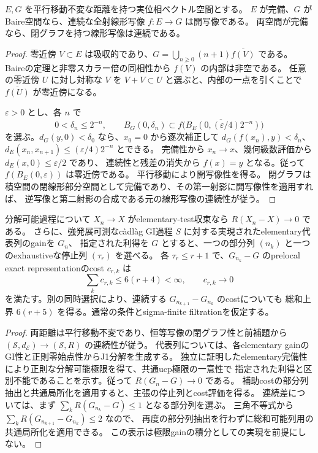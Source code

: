 \begin{lemma}[平行移動不変な完備距離を持つ実TVSの開写像と閉グラフ]
$E,G$ を平行移動不変な距離を持つ実位相ベクトル空間とする。
$E$ が完備、$G$ がBaire空間なら、連続な全射線形写像 $f:E\to G$ は開写像である。
両空間が完備なら、閉グラフを持つ線形写像は連続である。
\end{lemma}
\begin{proof}
零近傍 $V\subset E$ は吸収的であり、$G=\bigcup_{n\ge0}(n+1)\overline{f(V)}$ である。
Baireの定理と非零スカラー倍の同相性から $\overline{f(V)}$ の内部は非空である。
任意の零近傍 $U$ に対し対称な $V$ を $V+V\subset U$ と選ぶと、内部の一点を引くことで
$\overline{f(U)}$ が零近傍になる。

$\varepsilon>0$ とし、各 $n$ で
\[
 0<\delta_n\le2^{-n},\qquad
 B_G(0,\delta_n)\subset
 \overline{f\bigl(B_E(0,(\varepsilon/4)2^{-n})\bigr)}
\]
を選ぶ。$d_G(y,0)<\delta_0$ なら、$x_0=0$ から逐次補正して
$d_G(f(x_n),y)<\delta_n$、
$d_E(x_n,x_{n+1})\le(\varepsilon/4)2^{-n}$ とできる。
完備性から $x_n\to x$、幾何級数評価から $d_E(x,0)\le\varepsilon/2$ であり、
連続性と残差の消失から $f(x)=y$ となる。従って $f(B_E(0,\varepsilon))$ は零近傍である。
平行移動により開写像性を得る。
閉グラフは積空間の閉線形部分空間として完備であり、その第一射影に開写像性を適用すれば、
逆写像と第二射影の合成である元の線形写像の連続性が従う。
\end{proof}

\begin{proposition}[elementary収束から補助cost収束と共通局所化へ]\label{prop:topology-localization}
分解可能過程について $X_n\to X$ がelementary-test収束なら $R(X_n-X)\to0$ である。
さらに、強発展可測なc\`adl\`ag GI過程 $S$ に対する実現されたelementary代表列のgainを $G_n$、
指定された利得を $G$ とすると、一つの部分列 $(n_k)$ と一つのexhaustiveな停止列 $(\tau_r)$ を選べる。
各 $\tau_r\le r+1$ で、$G_{n_k}-G$ のprelocal exact representationのcost $c_{r,k}$ は
\[
 \sum_k c_{r,k}\le6(r+4)<\infty,\qquad c_{r,k}\longrightarrow0
\]
を満たす。別の同時選択により、連続する $G_{n_{k+1}}-G_{n_k}$ のcostについても
総和上界 $6(r+5)$ を得る。通常の条件とsigma-finite filtrationを仮定する。
\end{proposition}
\begin{proof}
両距離は平行移動不変であり、恒等写像の閉グラフ性と前補題から
$(\mathcal S,d_{\mathcal E})\to(\mathcal S,R)$ の連続性が従う。
代表列については、各elementary gainのGI性と正則零始点性からJ1分解を生成する。
独立に証明したelementary完備性により正則な分解可能極限を得て、共通ucp極限の一意性で
指定された利得と区別不能であることを示す。従って $R(G_n-G)\to0$ である。
補助costの部分列抽出と共通局所化を適用すると、主張の停止列とcost評価を得る。
連続差については、まず $\sum_k R(G_{n_k}-G)\le1$ となる部分列を選ぶ。
三角不等式から $\sum_k R(G_{n_{k+1}}-G_{n_k})\le2$ なので、
再度の部分列抽出を行わずに総和可能列用の共通局所化を適用できる。
この表示は極限gainの積分としての実現を前提にしない。
\end{proof}

